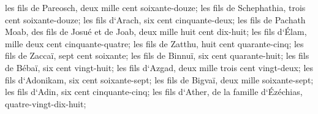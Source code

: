 \verse les fils de Pareosch, deux mille cent soixante-douze; 
\verse les fils de Schephathia, trois cent soixante-douze; 
\verse les fils d`Arach, six cent cinquante-deux; 
\verse les fils de Pachath Moab, des fils de Josué et de Joab, deux mille huit cent dix-huit; 
\verse les fils d`Élam, mille deux cent cinquante-quatre; 
\verse les fils de Zatthu, huit cent quarante-cinq; 
\verse les fils de Zaccaï, sept cent soixante; 
\verse les fils de Binnuï, six cent quarante-huit; 
\verse les fils de Bébaï, six cent vingt-huit; 
\verse les fils d`Azgad, deux mille trois cent vingt-deux; 
\verse les fils d`Adonikam, six cent soixante-sept; 
\verse les fils de Bigvaï, deux mille soixante-sept; 
\verse les fils d`Adin, six cent cinquante-cinq; 
\verse les fils d`Ather, de la famille d`Ézéchias, quatre-vingt-dix-huit; 
